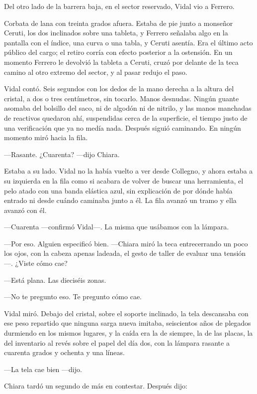 Del otro lado de la barrera baja, en el sector reservado, Vidal vio a Ferrero.

Corbata de lana con treinta grados afuera. Estaba de pie junto a monseñor Ceruti, los dos inclinados sobre una tableta, y Ferrero señalaba algo en la pantalla con el índice, una curva o una tabla, y Ceruti asentía. Era el último acto público del cargo; el retiro corría con efecto posterior a la ostensión. En un momento Ferrero le devolvió la tableta a Ceruti, cruzó por delante de la teca camino al otro extremo del sector, y al pasar redujo el paso.

Vidal contó. Seis segundos con los dedos de la mano derecha a la altura del cristal, a dos o tres centímetros, sin tocarlo. Manos desnudas. Ningún guante asomaba del bolsillo del saco, ni de algodón ni de nitrilo, y las manos manchadas de reactivos quedaron ahí, suspendidas cerca de la superficie, el tiempo justo de una verificación que ya no medía nada. Después siguió caminando. En ningún momento miró hacia la fila.

---Rasante. ¿Cuarenta? ---dijo Chiara.

Estaba a su lado. Vidal no la había vuelto a ver desde Collegno, y ahora estaba a su izquierda en la fila como si acabara de volver de buscar una herramienta, el pelo atado con una banda elástica azul, sin explicación de por dónde había entrado ni desde cuándo caminaba junto a él. La fila avanzó un tramo y ella avanzó con él.

---Cuarenta ---confirmó Vidal---. La misma que usábamos con la lámpara.

---Por eso. Alguien especificó bien. ---Chiara miró la teca entrecerrando un poco los ojos, con la cabeza apenas ladeada, el gesto de taller de evaluar una tensión---. ¿Viste cómo cae?

---Está plana. Las dieciséis zonas.

---No te pregunto eso. Te pregunto cómo cae.

Vidal miró. Debajo del cristal, sobre el soporte inclinado, la tela descansaba con ese peso repartido que ninguna sarga nueva imitaba, seiscientos años de plegados durmiendo en los mismos lugares, y la caída era la de siempre, la de las placas, la del inventario al revés sobre el papel del día dos, con la lámpara rasante a cuarenta grados y ochenta y una líneas.

---La tela cae bien ---dijo.

Chiara tardó un segundo de más en contestar. Después dijo:

